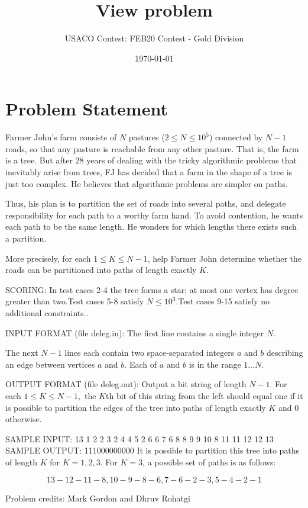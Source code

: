 \documentclass[12pt]{article}
\title{View problem}
\author{USACO Contest: FEB20 Contest - Gold Division}
\date{\today}
\begin{document}
\maketitle

\section*{Problem Statement}

Farmer John's farm consists of $N$ pastures ($2 \leq N \leq 10^5$) connected by
$N-1$ roads, so that any pasture is reachable from any other pasture. That is,
the farm is a tree. But after 28 years of dealing with the tricky algorithmic
problems that inevitably arise from trees, FJ has decided that a farm in the
shape of a tree is just too complex. He believes that algorithmic problems are
simpler on paths.

Thus, his plan is to partition the set of roads into several paths, and delegate
responsibility for each path to a worthy farm hand. To avoid contention, he
wants each path to be the same length. He wonders for which lengths there exists
such a partition.

More precisely, for each $1 \leq K \leq N-1$, help Farmer John determine whether
the roads can be partitioned into paths of length exactly $K$.

SCORING:
In test cases 2-4 the tree forms a star; at most one vertex has degree
greater than two.Test cases 5-8 satisfy $N\le 10^3$.Test cases 9-15 satisfy no additional constraints..

INPUT FORMAT (file deleg.in):
The first line contains a single integer $N$. 

The next $N-1$ lines each contain two space-separated integers $a$ and $b$
describing an edge between vertices $a$ and $b$.  Each of $a$ and $b$ is in the
range $1 \ldots N$. 

OUTPUT FORMAT (file deleg.out):
Output a bit string of length $N-1.$ For each $1\le K\le N-1,$ the $K$th bit of
this string from the left should equal one if it is possible to partition the edges of the
tree into paths of length exactly $K$ and $0$ otherwise.

SAMPLE INPUT:
13
1 2
2 3
2 4
4 5
2 6
6 7
6 8
8 9
9 10
8 11
11 12
12 13
SAMPLE OUTPUT: 
111000000000
It is possible to partition this tree into paths of length $K$ for $K=1,2,3.$
For $K=3$, a possible set of paths is as follows:

$$13-12-11-8, 10-9-8-6, 7-6-2-3, 5-4-2-1$$

Problem credits: Mark Gordon and Dhruv Rohatgi
\end{document}
